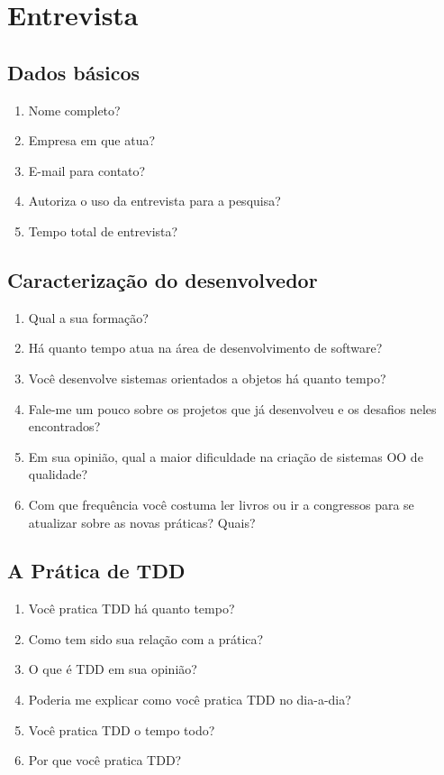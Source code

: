 \chapter{Entrevista}
\label{ape:entrevista}

\section{Dados básicos}

\begin{enumerate}
	\item Nome completo?
	\item Empresa em que atua?
	\item E-mail para contato?
	\item Autoriza o uso da entrevista para a pesquisa?
	\item Tempo total de entrevista?
\end{enumerate}

\section{Caracterização do desenvolvedor}

\begin{enumerate}
	\item Qual a sua formação?
	\item Há quanto tempo atua na área de desenvolvimento de software?
	\item Você desenvolve sistemas orientados a objetos há quanto tempo?	
	\item Fale-me um pouco sobre os projetos que já desenvolveu e os desafios neles encontrados?
	\item Em sua opinião, qual a maior dificuldade na criação de sistemas OO de qualidade?
	\item Com que frequência você costuma ler livros ou ir a congressos para se atualizar sobre as novas práticas? Quais?
\end{enumerate}

\section{A Prática de TDD}

\begin{enumerate}
	\item Você pratica TDD há quanto tempo?
	\item Como tem sido sua relação com a prática?
	\item O que é TDD em sua opinião?
	\item Poderia me explicar como você pratica TDD no dia-a-dia?
	\item Você pratica TDD o tempo todo?
	\item Por que você pratica TDD?
\end{enumerate}

